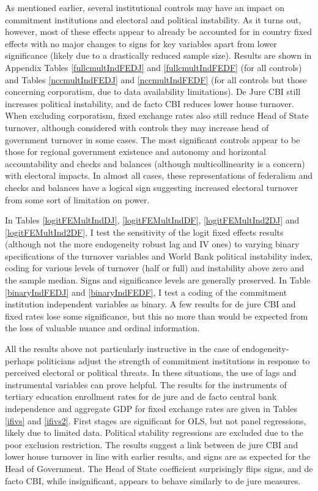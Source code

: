 \documentclass{article}
\begin{document}
    As mentioned earlier, several institutional controls may have an impact on commitment institutions and electoral and political instability. As it turns out, however, most of these effects appear to already be accounted for in country fixed effects with no major changes to signs for key variables apart from lower significance (likely due to a drastically reduced sample size). Results are shown in Appendix Tables \ref*{fullcmultIndFEDJ} and \ref*{fullcmultIndFEDF} (for all controls) and Tables \ref*{nccmultIndFEDJ} and \ref*{nccmultIndFEDF} (for all controls but those concerning corporatism, due to data availability limitations). De Jure CBI still increases political instability, and de facto CBI reduces lower house turnover. When excluding corporatism, fixed exchange rates also still reduce Head of State turnover, although considered with controls they may increase head of government turnover in some cases. The most significant controls appear to be those for regional government existence and autonomy and horizontal accountability and checks and balances (although multicollinearity is a concern) with electoral impacts. In almost all cases, these representations of federalism and checks and balances have a logical sign suggesting increased electoral turnover from some sort of limitation on power.

    In Tables \ref*{logitFEMultIndDJ}, \ref*{logitFEMultIndDF}, \ref*{logitFEMultInd2DJ} and \ref*{logitFEMultInd2DF}, I test the sensitivity of the logit fixed effects results (although not the more endogeneity robust lag and IV ones) to varying binary specifications of the turnover variables and World Bank political instability index, coding for various levels of turnover (half or full) and instability above zero and the sample median. Signs and significance levels are generally preserved. In Table \ref*{binaryIndFEDJ} and \ref*{binaryIndFEDF}, I test a coding of the commitment institution independent variables as binary. A few results for de jure CBI and fixed rates lose some significance, but this no more than would be expected from the loss of valuable nuance and ordinal information.

    All the results above not particularly instructive in the case of endogeneity- perhaps politicians adjust the strength of commitment institutions in response to perceived electoral or political threats. In these situations, the use of lags and instrumental variables can prove helpful. The results for the instruments of tertiary education enrollment rates for de jure and de facto central bank independence and aggregate GDP for fixed exchange rates are given in Tables \ref*{ifivs} and \ref*{ifivs2}. First stages are significant for OLS, but not panel regressions, likely due to limited data. Political stability regressions are excluded due to the poor exclusion restriction. The results suggest a link between de jure CBI and lower house turnover in line with earlier results, and signs are as expected for the Head of Government. The Head of State coefficient surprisingly flips signs, and de facto CBI, while insignificant, appears to behave similarly to de jure measures.
\end{document}
